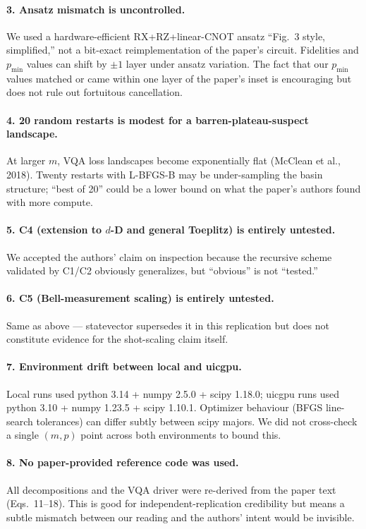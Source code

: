 \documentclass[11pt]{article}
\begin{document}
\paragraph{3. Ansatz mismatch is uncontrolled.} We used a hardware-efficient
RX+RZ+linear-CNOT ansatz ``Fig.~3 style, simplified,'' not a bit-exact
reimplementation of the paper's circuit. Fidelities and $p_{\min}$ values can
shift by $\pm 1$ layer under ansatz variation. The fact that our
$p_{\min}$ values matched or came within one layer of the paper's inset is
encouraging but does not rule out fortuitous cancellation.

\paragraph{4. 20 random restarts is modest for a barren-plateau-suspect
landscape.} At larger $m$, VQA loss landscapes become exponentially flat
(McClean et al., 2018). Twenty restarts with L-BFGS-B may be under-sampling
the basin structure; ``best of 20'' could be a lower bound on what the
paper's authors found with more compute.

\paragraph{5. C4 (extension to $d$-D and general Toeplitz) is entirely
untested.} We accepted the authors' claim on inspection because the recursive
scheme validated by C1/C2 obviously generalizes, but ``obvious'' is not
``tested.''

\paragraph{6. C5 (Bell-measurement scaling) is entirely untested.} Same as
above --- statevector supersedes it in this replication but does not
constitute evidence for the shot-scaling claim itself.

\paragraph{7. Environment drift between local and uicgpu.} Local runs used
python 3.14 + numpy 2.5.0 + scipy 1.18.0; uicgpu runs used python 3.10 +
numpy 1.23.5 + scipy 1.10.1. Optimizer behaviour (BFGS line-search
tolerances) can differ subtly between scipy majors. We did not cross-check a
single $(m,p)$ point across both environments to bound this.

\paragraph{8. No paper-provided reference code was used.} All decompositions
and the VQA driver were re-derived from the paper text (Eqs.~11--18). This
is good for independent-replication credibility but means a subtle mismatch
between our reading and the authors' intent would be invisible.
\end{document}
